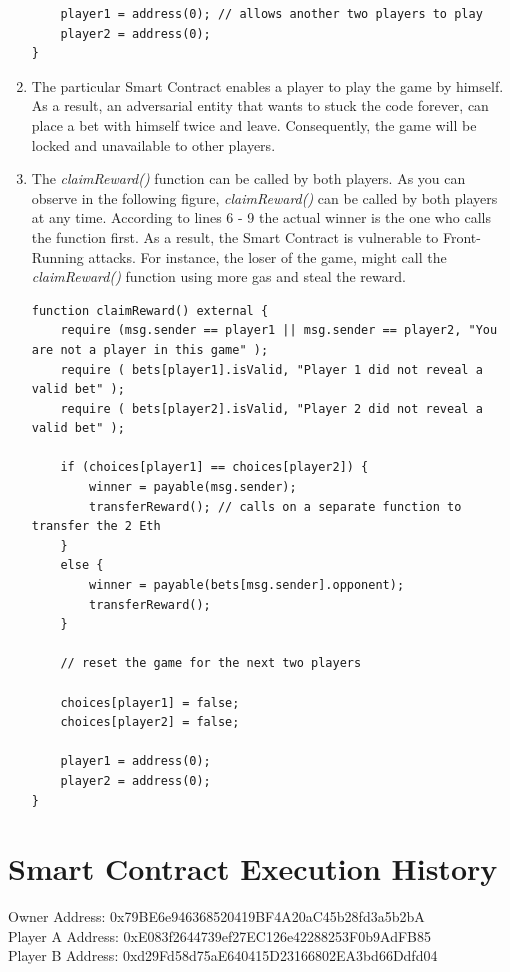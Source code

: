 \documentclass[12pt,a4paper]{article}
\begin{document}
\begin{enumerate}
\begin{lstlisting}
    player1 = address(0); // allows another two players to play
    player2 = address(0);
}
\end{lstlisting}
    \item The particular Smart Contract enables a player to play the game by himself. As a result, 
    an adversarial entity that wants to stuck the code forever, can place a bet with himself twice and leave.
    Consequently, the game will be locked and unavailable to other players.
    \item The \emph{claimReward()} function can be called by both players. As you can observe in 
    the following figure, \emph{claimReward()} can be called by both players at any time. According to lines
    6 - 9 the actual winner is the one who calls the function first. As a result, the Smart Contract
    is vulnerable to Front-Running attacks. For instance, the loser of the game, might call the
    \emph{claimReward()} function using more gas and steal the reward. \\

\begin{lstlisting}
function claimReward() external {
    require (msg.sender == player1 || msg.sender == player2, "You are not a player in this game" );
    require ( bets[player1].isValid, "Player 1 did not reveal a valid bet" );
    require ( bets[player2].isValid, "Player 2 did not reveal a valid bet" );

    if (choices[player1] == choices[player2]) {
        winner = payable(msg.sender);
        transferReward(); // calls on a separate function to transfer the 2 Eth
    }
    else {
        winner = payable(bets[msg.sender].opponent);
        transferReward();
    }

    // reset the game for the next two players

    choices[player1] = false;
    choices[player2] = false;

    player1 = address(0);
    player2 = address(0);
}
\end{lstlisting}
\end{enumerate}

\section*{Smart Contract Execution History}

Owner Address: 0x79BE6e946368520419BF4A20aC45b28fd3a5b2bA \\
Player A Address: 0xE083f2644739ef27EC126e42288253F0b9AdFB85 \\
Player B Address: 0xd29Fd58d75aE640415D23166802EA3bd66Ddfd04 \\
\end{document}
